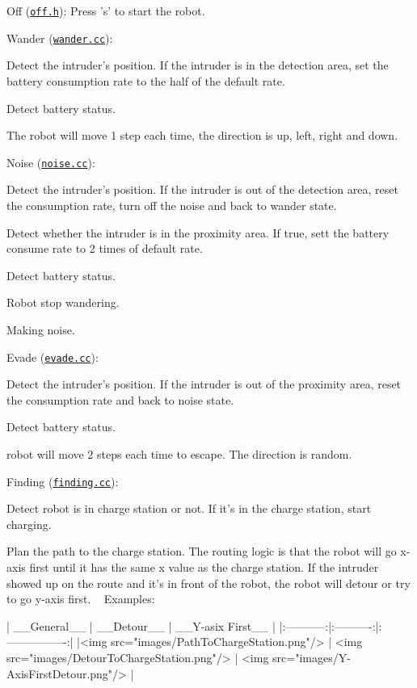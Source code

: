 \begin{DoxyItemize}
\item Off (\href{off.h}{\tt off.\+h})\+: Press 's' to start the robot.
\item Wander (\href{wander.cc}{\tt wander.\+cc})\+:
\begin{DoxyEnumerate}
\item Detect the intruder's position. If the intruder is in the detection area, set the battery consumption rate to the half of the default rate.
\item Detect battery status.
\item The robot will move 1 step each time, the direction is up, left, right and down.
\end{DoxyEnumerate}
\item Noise (\href{noise.cc}{\tt noise.\+cc})\+:
\begin{DoxyEnumerate}
\item Detect the intruder's position. If the intruder is out of the detection area, reset the consumption rate, turn off the noise and back to wander state.
\item Detect whether the intruder is in the proximity area. If true, sett the battery consume rate to 2 times of default rate.
\item Detect battery status.
\item Robot stop wandering.
\item Making noise.
\end{DoxyEnumerate}
\item Evade (\href{evade.cc}{\tt evade.\+cc})\+:
\begin{DoxyEnumerate}
\item Detect the intruder's position. If the intruder is out of the proximity area, reset the consumption rate and back to noise state.
\item Detect battery status.
\item robot will move 2 steps each time to escape. The direction is random.
\end{DoxyEnumerate}
\item Finding (\href{finding.cc}{\tt finding.\+cc})\+:
\begin{DoxyEnumerate}
\item Detect robot is in charge station or not. If it's in the charge station, start charging.
\item Plan the path to the charge station. The routing logic is that the robot will go x-\/axis first until it has the same x value as the charge station. If the intruder showed up on the route and it's in front of the robot, the robot will detour or try to go y-\/axis first. ~\newline
Examples\+: \begin{DoxyVerb}| __General__ | __Detour__ | __Y-asix First__ |
|:-----------:|:----------:|:----------------:|
|<img src="images/PathToChargeStation.png"/> | <img src="images/DetourToChargeStation.png"/> | <img src="images/Y-AxisFirstDetour.png"/> |
\end{DoxyVerb}


\end{DoxyEnumerate}
\end{DoxyItemize}
